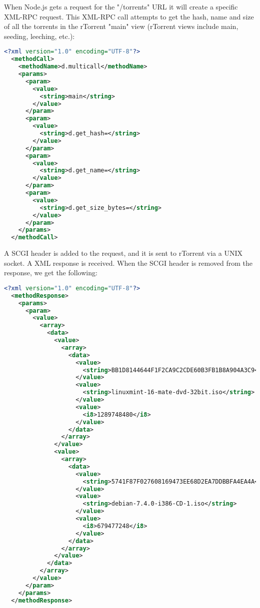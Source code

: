 When Node.js gets a request for the "/torrents" URL it will create a specific XML-RPC request. This XML-RPC call attempts to get the hash, name and size of all the torrents in the rTorrent "main" view (rTorrent views include main, seeding, leeching, etc.):
\vspace{10px}
\begin{lstlisting}[caption=Node.js generated XML-RPC request, language=XML]
  <?xml version="1.0" encoding="UTF-8"?>
  <methodCall>
    <methodName>d.multicall</methodName>
    <params>
      <param>
        <value>
          <string>main</string>
        </value>
      </param>
      <param>
        <value>
          <string>d.get_hash=</string>
        </value>
      </param>
      <param>
        <value>
          <string>d.get_name=</string>
        </value>
      </param>
      <param>
        <value>
          <string>d.get_size_bytes=</string>
        </value>
      </param>
    </params>
  </methodCall>
\end{lstlisting}

A SCGI header is added to the request, and it is sent to rTorrent via a UNIX socket. A XML response is received. When the SCGI header is removed from the response, we get the following:
\vspace{10px}
\begin{lstlisting}[caption=XML-RPC response, language=XML]
  <?xml version="1.0" encoding="UTF-8"?>
  <methodResponse>
    <params>
      <param>
        <value>
          <array>
            <data>
              <value>
                <array>
                  <data>
                    <value>
                      <string>BB1D8144644F1F2CA9C2CDE60B3FB1B8A904A3C9</string>
                    </value>
                    <value>
                      <string>linuxmint-16-mate-dvd-32bit.iso</string>
                    </value>
                    <value>
                      <i8>1289748480</i8>
                    </value>
                  </data>
                </array>
              </value>
              <value>
                <array>
                  <data>
                    <value>
                      <string>5741F87F027608169473EE68D2EA7DDBBFA4EA4A</string>
                    </value>
                    <value>
                      <string>debian-7.4.0-i386-CD-1.iso</string>
                    </value>
                    <value>
                      <i8>679477248</i8>
                    </value>
                  </data>
                </array>
              </value>
            </data>
          </array>
        </value>
      </param>
    </params>
  </methodResponse>
\end{lstlisting}

